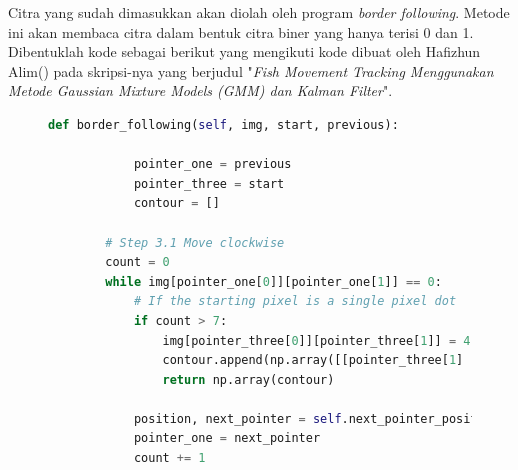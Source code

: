 Citra yang sudah dimasukkan akan diolah oleh program 
\textit{border following}. Metode ini akan membaca citra 
dalam bentuk citra biner yang hanya terisi 0 dan 1. 
Dibentuklah kode sebagai berikut yang mengikuti kode 
dibuat oleh Hafizhun Alim(\cite{Hafizhun}) pada skripsi-nya 
yang berjudul "\textit{Fish Movement Tracking Menggunakan 
Metode Gaussian Mixture Models (GMM) dan Kalman Filter}".
\begin{figure}[H]
	\centering
	\begin{lstlisting}[language=Python, basicstyle=\tiny]
		def border_following(self, img, start, previous):

			pointer_one = previous
			pointer_three = start
			contour = []

		# Step 3.1 Move clockwise
		count = 0
		while img[pointer_one[0]][pointer_one[1]] == 0:
			# If the starting pixel is a single pixel dot
			if count > 7:
				img[pointer_three[0]][pointer_three[1]] = 4
				contour.append(np.array([[pointer_three[1] - 1, pointer_three[0] - 1]]))
				return np.array(contour)
					
			position, next_pointer = self.next_pointer_position(pointer_one, pointer_three, 1)
			pointer_one = next_pointer
			count += 1
	
	\end{lstlisting}
\end{figure}
